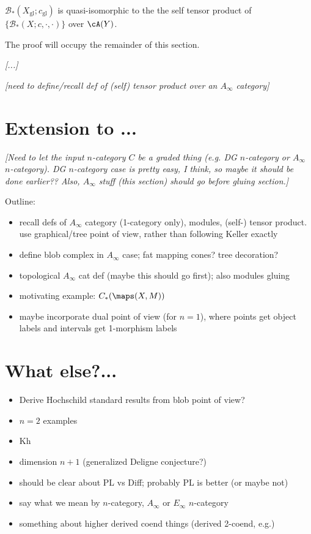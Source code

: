 \documentclass[11pt,leqno]{amsart}
\def\bc{{\mathcal B}}
\def\sgl{_\mathrm{gl}}
\def\nn#1{{{\it \small [#1]}}}
\begin{document}
\begin{thm}
$\bc_*(X\sgl; c\sgl)$ is quasi-isomorphic to the the self tensor product
of $\{\bc_*(X; c, \cdot, \cdot)\}$ over $\cA(Y)$.
\end{thm}

The proof will occupy the remainder of this section.

\nn{...}

\bigskip

\nn{need to define/recall def of (self) tensor product over an $A_\infty$ category}





\section{Extension to ...}

\nn{Need to let the input $n$-category $C$ be a graded thing
(e.g. DG $n$-category or $A_\infty$ $n$-category).
DG $n$-category case is pretty easy, I think, so maybe it should be done earlier??
Also, $A_\infty$ stuff (this section) should go before gluing section.}

\bigskip

Outline:
\begin{itemize}
\item recall defs of $A_\infty$ category (1-category only), modules, (self-) tensor product.
use graphical/tree point of view, rather than following Keller exactly
\item define blob complex in $A_\infty$ case; fat mapping cones?  tree decoration?
\item topological $A_\infty$ cat def (maybe this should go first); also modules gluing
\item motivating example: $C_*(\maps(X, M))$
\item maybe incorporate dual point of view (for $n=1$), where points get
object labels and intervals get 1-morphism labels
\end{itemize}











\section{What else?...}

\begin{itemize}
\item Derive Hochschild standard results from blob point of view?
\item $n=2$ examples
\item Kh
\item dimension $n+1$ (generalized Deligne conjecture?)
\item should be clear about PL vs Diff; probably PL is better
(or maybe not)
\item say what we mean by $n$-category, $A_\infty$ or $E_\infty$ $n$-category
\item something about higher derived coend things (derived 2-coend, e.g.)
\end{itemize}
\end{document}
